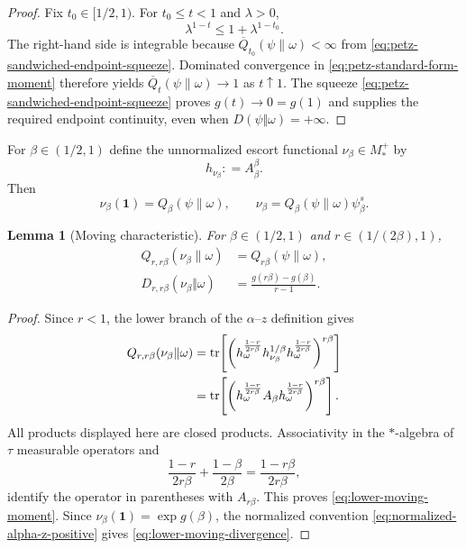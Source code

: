 \documentclass[12pt]{article}
\numberwithin{equation}{section}
\newtheorem{lemma}[theorem]{Lemma}
\theoremstyle{definition}
\theoremstyle{remark}
\newcommand{\one}{\mathbf 1}
\newcommand{\?}{\overset{?}{=}}
\newcommand{\defeq}{\mathrel{\mathop:}=}
\DeclareMathOperator{\tr}{tr}
\begin{document}
\begin{proof}
Fix
$t_0\in[1/2,1)$.  For $t_0\leq t<1$ and $\lambda>0$,
\begin{equation}
  \lambda^{1-t}\leq1+\lambda^{1-t_0}.
\end{equation}
The right-hand side is integrable because
$\overline Q_{t_0}(\psi\|\omega)<\infty$ from \eqref{eq:petz-sandwiched-endpoint-squeeze}.  Dominated convergence in
\eqref{eq:petz-standard-form-moment} therefore yields
$\overline Q_t(\psi\|\omega)\to1$ as $t\uparrow1$.  The squeeze
\eqref{eq:petz-sandwiched-endpoint-squeeze} proves
$g(t)\to0=g(1)$ and supplies the required endpoint continuity, even when
$D(\psi\Vert\omega)=+\infty$.
\end{proof}

For $\beta\in(1/2,1)$ define the unnormalized escort functional
$\nu_\beta\in M_*^+$ by
\begin{equation}
  h_{\nu_\beta}\defeq A_\beta^\beta.
  \label{eq:lower-unnormalized-escort}
\end{equation}
Then
\begin{equation}
  \nu_\beta(\one)=Q_\beta(\psi\|\omega),
  \qquad
  \nu_\beta=Q_\beta(\psi\|\omega)\psi_\beta^s.
  \label{eq:lower-escort-scaling}
\end{equation}

\begin{lemma}[Moving characteristic]
\label{lem:lower-moving-characteristic}
For $\beta\in(1/2,1)$ and
$r\in(1/(2\beta),1)$,
\begin{align}
  Q_{r,r\beta}(\nu_\beta\|\omega)
  &=Q_{r\beta}(\psi\|\omega),
  \label{eq:lower-moving-moment}\\
  D_{r,r\beta}(\nu_\beta\Vert\omega)
  &=\frac{g(r\beta)-g(\beta)}{r-1}.
  \label{eq:lower-moving-divergence}
\end{align}
\end{lemma}

\begin{proof}
Since $r<1$, the lower branch of the $\alpha$--$z$ definition gives
\begin{align}
  Q_{r,r\beta}(\nu_\beta\|\omega)
  &=\tr\!\left[
  \left(
  h_\omega^{\frac{1-r}{2r\beta}}
  h_{\nu_\beta}^{1/\beta}
  h_\omega^{\frac{1-r}{2r\beta}}
  \right)^{r\beta}\right]\notag\\
  &=\tr\!\left[
  \left(
  h_\omega^{\frac{1-r}{2r\beta}}
  A_\beta
  h_\omega^{\frac{1-r}{2r\beta}}
  \right)^{r\beta}\right].
  \label{eq:lower-moving-computation}
\end{align}
All products displayed here are closed products.  Associativity in the $*$-algebra of $\tau$ measurable operators and
\begin{equation}
  \frac{1-r}{2r\beta}+\frac{1-\beta}{2\beta}
  =\frac{1-r\beta}{2r\beta},
\end{equation}
identify the operator in parentheses with $A_{r\beta}$.  This proves
\eqref{eq:lower-moving-moment}.  Since
$\nu_\beta(\one)=\exp g(\beta)$, the normalized convention
\eqref{eq:normalized-alpha-z-positive} gives
\eqref{eq:lower-moving-divergence}.
\end{proof}
\end{document}
